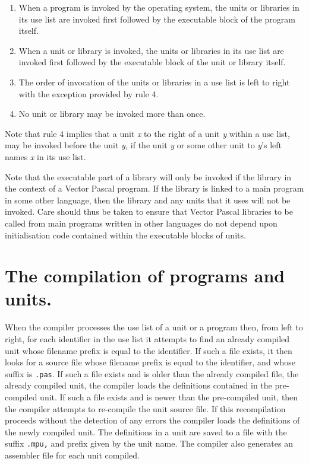 {\begin{enumerate}
\item When a program is invoked by the operating system, the units or libraries in
its use list are invoked first followed by the executable block of the program
itself.
\item When a unit or library is invoked, the units or libraries in its use list are
invoked first followed by the executable block of the unit or library itself.
\item The order of invocation of the units or libraries in a use list is left to right
with the exception provided by rule 4.
\item No unit or library may be invoked more than once.
\end{enumerate}
Note that rule 4 implies that a unit \emph{x} to the right of a unit \emph{y}
within a use list, may be invoked before the unit \emph{y,} if the unit \emph{y}
or some other unit to \emph{y}'s left names \emph{x} in its use list.

Note that the executable part of a library will only be invoked if the library
in the context of a Vector Pascal program. If the library is linked to a main
program in some other language, then the library and any units that it uses
will not be invoked. Care should thus be taken to ensure that Vector Pascal
libraries to be called from main programs written in other languages do not
depend upon initialisation code contained within the executable blocks of units.



\section{The compilation of programs and units.}

When the compiler processes the use list of a unit or a program
then, from left to right, for each identifier in the use list it attempts to
find an already compiled unit whose filename prefix is equal to the identifier.
If such a file exists, it then looks for a source file whose
filename prefix is equal to the identifier, and whose suffix
is \texttt{.pas}. If such a file exists and is older than the
already compiled file, the already compiled unit, the compiler loads the definitions
contained in the pre-compiled unit. If such a file exists and is newer than
the pre-compiled unit, then the compiler attempts to re-compile the unit source
file. If this recompilation proceeds without the detection of any errors the
compiler loads the definitions of the newly compiled unit. The definitions in
a unit are saved to a file with the suffix \texttt{.mpu,} and prefix given by
the unit name. The compiler also generates an assembler file for each unit compiled.


}

